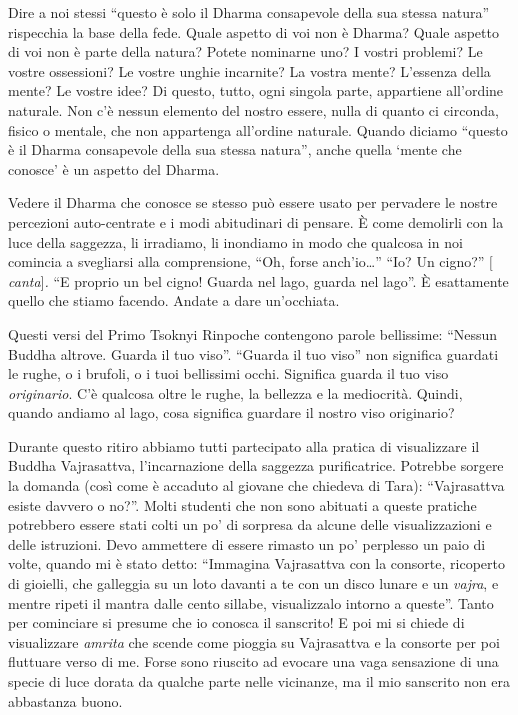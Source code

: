 Dire a noi stessi ``questo è solo il Dharma consapevole della sua stessa natura'' rispecchia la base della fede. Quale aspetto di voi non è Dharma? Quale aspetto di voi non è parte della natura? Potete nominarne uno? I vostri problemi? Le vostre ossessioni? Le vostre unghie incarnite? La vostra mente? L'essenza della mente? Le vostre idee? Di questo, tutto, ogni singola parte, appartiene all'ordine naturale. Non c'è nessun elemento del nostro essere, nulla di quanto ci circonda, fisico o mentale, che non appartenga all'ordine naturale. Quando diciamo ``questo è il Dharma consapevole della sua stessa natura'', anche quella `mente che conosce' è un aspetto del Dharma.

Vedere il Dharma che conosce se stesso può essere usato per pervadere le nostre percezioni auto-centrate e i modi abitudinari di pensare. È come demolirli con la luce della saggezza, li irradiamo, li inondiamo in modo che qualcosa in noi comincia a svegliarsi alla comprensione, ``Oh, forse anch'io\ldots{}'' ``Io? Un cigno?'' $[$\textit{canta}$]$\textit{.} ``E proprio un bel cigno! Guarda nel lago, guarda nel lago''. È esattamente quello che stiamo facendo. Andate a dare un'occhiata.

Questi versi del Primo Tsoknyi Rinpoche contengono parole bellissime: ``Nessun Buddha altrove. Guarda il tuo viso''. ``Guarda il tuo viso'' non significa guardati le rughe, o i brufoli, o i tuoi bellissimi occhi. Significa guarda il tuo viso \textit{originario}. C'è qualcosa oltre le rughe, la bellezza e la mediocrità. Quindi, quando andiamo al lago, cosa significa guardare il nostro viso originario?

Durante questo ritiro abbiamo tutti partecipato alla pratica di visualizzare il Buddha Vajrasattva, l'incarnazione della saggezza purificatrice. Potrebbe sorgere la domanda (così come è accaduto al giovane che chiedeva di Tara): ``Vajrasattva esiste davvero o no?''. Molti studenti che non sono abituati a queste pratiche potrebbero essere stati colti un po' di sorpresa da alcune delle visualizzazioni e delle istruzioni. Devo ammettere di essere rimasto un po' perplesso un paio di volte, quando mi è stato detto: ``Immagina Vajrasattva con la consorte, ricoperto di gioielli, che galleggia su un loto davanti a te con un disco lunare e un \textit{vajra}, e mentre ripeti il mantra dalle cento sillabe, visualizzalo intorno a queste''. Tanto per cominciare si presume che io conosca il sanscrito! E poi mi si chiede di visualizzare \textit{amrita} che scende come pioggia su Vajrasattva e la consorte per poi fluttuare verso di me. Forse sono riuscito ad evocare una vaga sensazione di una specie di luce dorata da qualche parte nelle vicinanze, ma il mio sanscrito non era abbastanza buono.

